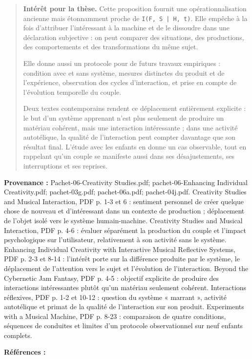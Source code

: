 \documentclass[10pt,a4paper]{article}
\begin{document}
\begin{quote}
\textbf{Intérêt pour la thèse.} Cette proposition fournit une opérationnalisation ancienne mais étonnamment proche de \texttt{I(F, S | H, t)}. Elle empêche à la fois d'attribuer l'intéressant à la machine et de le dissoudre dans une déclaration subjective : on peut comparer des situations, des productions, des comportements et des transformations du même sujet.

Elle donne aussi un protocole pour de futurs travaux empiriques : condition avec et sans système, mesures distinctes du produit et de l'expérience, observation des cycles d'interaction, et prise en compte de l'évolution temporelle du couple.

Deux textes contemporains rendent ce déplacement entièrement explicite : le but d'un système apprenant n'est plus seulement de produire un matériau cohérent, mais une interaction intéressante ; dans une activité autotélique, la qualité de l'interaction peut compter davantage que son résultat final. L'étude avec les enfants en donne un cas observable, tout en rappelant qu'un couple se manifeste aussi dans ses désajustements, ses interruptions et ses reprises.
\end{quote}
{\footnotesize\color{metadata}\textbf{Provenance :} Pachet-06-Creativity Studies.pdf; pachet-06-Enhancing Individual Creativity.pdf; pachet-03g.pdf; pachet-06a.pdf; pachet-04j.pdf. Creativity Studies and Musical Interaction, PDF p. 1-3 et 6 : sentiment personnel de créer quelque chose de nouveau et d'intéressant dans un contexte de production ; déplacement de l'objet isolé vers le système humain-machine. Creativity Studies and Musical Interaction, PDF p. 4-6 : évaluer séparément la production du couple et l'impact psychologique sur l'utilisateur, relativement à son activité sans le système. Enhancing Individual Creativity with Interactive Musical Reflective Systems, PDF p. 2-3 et 8-14 : l'intérêt porte sur la différence produite par le système, le déplacement de l'attention vers le sujet et l'évolution de l'interaction. Beyond the Cybernetic Jam Fantasy, PDF p. 4-5 : objectif explicite de produire des interactions intéressantes plutôt qu'un matériau seulement cohérent. Interactions réflexives, PDF p. 1-2 et 10-12 : question du système « marrant », activité autotélique et primat de la qualité de l'interaction sur son produit. Experiments with a Musical Machine, PDF p. 8-23 : comparaison de quatre conditions, séquences de conduites et limites d'un protocole observationnel sur neuf enfants complets.\par}
{\footnotesize\color{metadata}\textbf{Références :} \parencite{pachet2006creativity,pachet2006reflective,pachet2004cybernetic,pachet2006interactionsreflexives,addessi2005experiments}\par}
\end{document}
